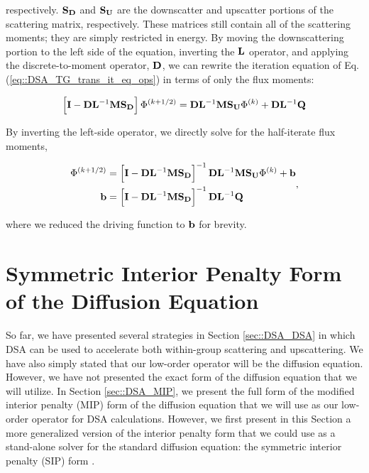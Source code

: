 \noindent respectively. ${\bf S_D}$ and ${\bf S_U}$ are the downscatter and upscatter portions of the scattering matrix, respectively. These matrices still contain all of the scattering moments; they are simply restricted in energy. By moving the downscattering portion to the left side of the equation, inverting the ${\bf L}$ operator, and applying the discrete-to-moment operator, ${\bf D}$, we can rewrite the iteration equation of Eq. (\ref{eq::DSA_TG_trans_it_eq_ops}) in terms of only the flux moments:

\begin{equation}
\label{eq::DSA_TG_half_it}
\left[ {\bf I} - {\bf D}{\bf L}^{-1} {\bf M} {\bf S_D} \right]\Phi^{(k+1/2)} = {\bf D}{\bf L}^{-1}  {\bf M} {\bf S_U} \Phi^{(k)} + {\bf D}{\bf L}^{-1}  {\bf Q}
\end{equation}

\noindent By inverting the left-side operator, we directly solve for the half-iterate flux moments,

\begin{equation}
\label{eq::DSA_TG_half_it_sol}
\begin{aligned}
\Phi^{(k+1/2)} &= \left[ {\bf I} - {\bf D}{\bf L}^{-1} {\bf M} {\bf S_D} \right]^{-1} {\bf D}{\bf L}^{-1}  {\bf M} {\bf S_U} \Phi^{(k)} + {\bf b}  \\
{\bf b} &= \left[ {\bf I} - {\bf D}{\bf L}^{-1} {\bf M} {\bf S_D} \right]^{-1} {\bf D}{\bf L}^{-1}  {\bf Q}
\end{aligned} ,
\end{equation}

\noindent where we reduced the driving function to ${\bf b}$ for brevity.

\section{Symmetric Interior Penalty Form of the Diffusion Equation}
\label{sec::DSA_SIP}

So far, we have presented several strategies in Section \ref{sec::DSA_DSA} in which DSA can be used to accelerate both within-group scattering and upscattering. We have also simply stated that our low-order operator will be the diffusion equation. However, we have not presented the exact form of the diffusion equation that we will utilize. In Section \ref{sec::DSA_MIP}, we present the full form of the modified interior penalty (MIP) form of the diffusion equation that we will use as our low-order operator for DSA calculations. However, we first present in this Section a more generalized version of the interior penalty form that we could use as a stand-alone solver for the standard diffusion equation: the symmetric interior penalty (SIP) form \cite{arnold2002unified,ragusa2015discontinuous,ref::SIP_3D}.


